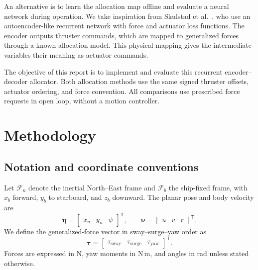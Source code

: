 \documentclass[conference]{IEEEtran}
\newcommand{\T}{^{\mathsf T}}
\begin{document}
An alternative is to learn the allocation map offline and evaluate a neural
network during operation. We take inspiration from
Skulstad et al.~\cite{Skulstad2023}, who use an autoencoder-like recurrent
network with force and actuator loss functions. The encoder outputs thruster
commands, which are mapped to generalized forces through a known allocation
model. This physical mapping gives the intermediate variables their
meaning as actuator commands.

The objective of this report is to implement and evaluate this recurrent
encoder--decoder allocator. Both allocation methods use the same signed
thruster offsets, actuator ordering, and force convention. All comparisons
use prescribed force requests in open loop, without a motion controller.

\section{Methodology}
\subsection{Notation and coordinate conventions}
Let $\mathcal F_n$ denote the inertial North--East frame and
$\mathcal F_b$ the ship-fixed frame, with $x_b$ forward, $y_b$ to starboard,
and $z_b$ downward. The planar pose and body velocity are
\begin{equation}
 \bm{\eta}=\begin{bmatrix}x_n&y_n&\psi\end{bmatrix}\T,\qquad
 \bm{\nu}=\begin{bmatrix}u&v&r\end{bmatrix}\T .
\end{equation}
We define the generalized-force vector in sway--surge--yaw order as
\begin{equation}
 \bm{\tau}=\begin{bmatrix}
 \tau_{\mathrm{sway}}&\tau_{\mathrm{surge}}&\tau_{\mathrm{yaw}}
 \end{bmatrix}\T .
 \label{eq:tauorder}
\end{equation}
Forces are expressed in N, yaw moments in N\,m, and angles in rad unless
stated otherwise.
\end{document}
